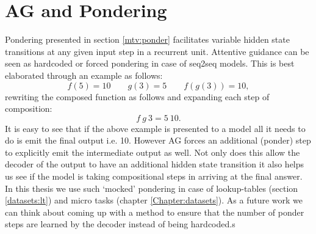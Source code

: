\section{AG and Pondering} \label{pm:ag-ponder}
Pondering presented in section \ref{mtv:ponder} facilitates variable hidden state transitions at any given input step in a recurrent unit. Attentive guidance can be seen as hardcoded or forced pondering in case of seq2seq models. This is best elaborated through an example as follows:
\begin{equation}
	f(5) = 10 \qquad g(3) = 5\qquad f(g(3)) = 10,
\end{equation}
rewriting the composed function as follows and expanding each step of composition:
\begin{equation}
	f\ g\ 3 = 5\ 10.
\end{equation}
It is easy to see that if the above example is presented to a model all it needs to do is emit the final output i.e. 10. However AG forces an additional (ponder) step to explicitly emit the intermediate output as well. Not only does this allow the decoder of the output to have an additional hidden state transition it also helps us see if the model is taking compositional steps in arriving at the final answer. In this thesis we use such \lq mocked\rq{} pondering in case of lookup-tables (section \ref{datasets:lt}) and micro tasks (chapter \ref{Chapter:datasets}). As a future work we can think about coming up with a method to ensure that the number of ponder steps are learned by the decoder instead of being hardcoded.s